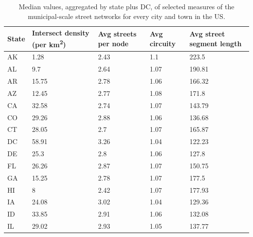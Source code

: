 \documentclass{article}
\begin{document}
\begin{table}
\centering
\caption{Median values, aggregated by state plus DC, of selected measures of the municipal-scale street networks for every city and town in the US.}
\label{table04}
\begin{tabular}{p{1in}p{1in}p{1in}p{1in}p{1in}}
	\toprule
	State & Intersect density (per km\textsuperscript{2}) & Avg streets per node & Avg circuity & Avg street segment length \\
	\midrule
	AK    & 1.28                        & 2.43                 & 1.1          & 223.5                     \\
	AL    & 9.7                         & 2.64                 & 1.07         & 190.81                    \\
	AR    & 15.75                       & 2.78                 & 1.06         & 166.32                    \\
	AZ    & 12.45                       & 2.77                 & 1.08         & 171.8                     \\
	CA    & 32.58                       & 2.74                 & 1.07         & 143.79                    \\
	CO    & 29.26                       & 2.88                 & 1.06         & 136.68                    \\
	CT    & 28.05                       & 2.7                  & 1.07         & 165.87                    \\
	DC    & 58.91                       & 3.26                 & 1.04         & 122.23                    \\
	DE    & 25.3                        & 2.8                  & 1.06         & 127.8                     \\
	FL    & 26.26                       & 2.87                 & 1.07         & 150.75                    \\
	GA    & 15.25                       & 2.78                 & 1.07         & 177.5                     \\
	HI    & 8                           & 2.42                 & 1.07         & 177.93                    \\
	IA    & 24.08                       & 3.02                 & 1.04         & 129.36                    \\
	ID    & 33.85                       & 2.91                 & 1.06         & 132.08                    \\
	IL    & 29.02                       & 2.93                 & 1.05         & 137.77                    \\

\end{tabular}
\end{table}
\end{document}
